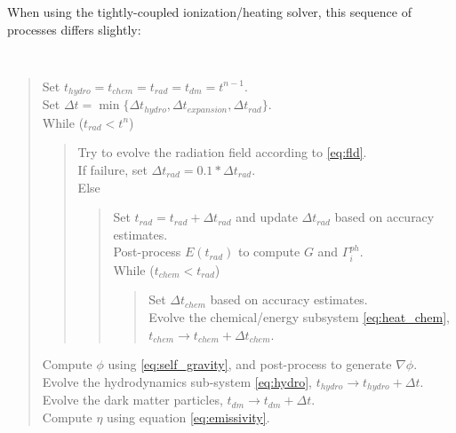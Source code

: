 When using the tightly-coupled ionization/heating
solver, this sequence of processes differs slightly: 
{\tt
\begin{quote}
Set $t_{hydro}=t_{chem}=t_{rad}=t_{dm} = t^{n-1}$.\\
Set $\Delta t = \min\{\Delta t_{hydro}, \Delta t_{expansion}, \Delta t_{rad}\}$.\\
While ($t_{rad} < t^n$)
\begin{quote}
  Try to evolve the radiation field according to \eqref{eq:fld}.\\
  If failure, set $\Delta t_{rad} = 0.1*\Delta t_{rad}$.\\
  Else
  \begin{quote}
    Set $t_{rad} = t_{rad} + \Delta t_{rad}$ and update $\Delta t_{rad}$
    based on accuracy estimates. \\
    Post-process $E(t_{rad})$ to compute $G$ and $\Gamma_i^{ph}$.\\
    While ($t_{chem} < t_{rad}$)
    \begin{quote}
      Set $\Delta t_{chem}$ based on accuracy estimates. \\
      Evolve the chemical/energy subsystem \eqref{eq:heat_chem},
      $t_{chem} \to t_{chem} + \Delta t_{chem}$.
    \end{quote}
  \end{quote}
\end{quote}
Compute $\phi$ using \eqref{eq:self_gravity}, and post-process to
generate $\nabla\phi$.\\ 
Evolve the hydrodynamics sub-system \eqref{eq:hydro}, $t_{hydro} \to
t_{hydro} + \Delta t$.\\
Evolve the dark matter particles, $t_{dm} \to t_{dm} + \Delta t$.\\
Compute $\eta$ using equation \eqref{eq:emissivity}.
\end{quote}
}
